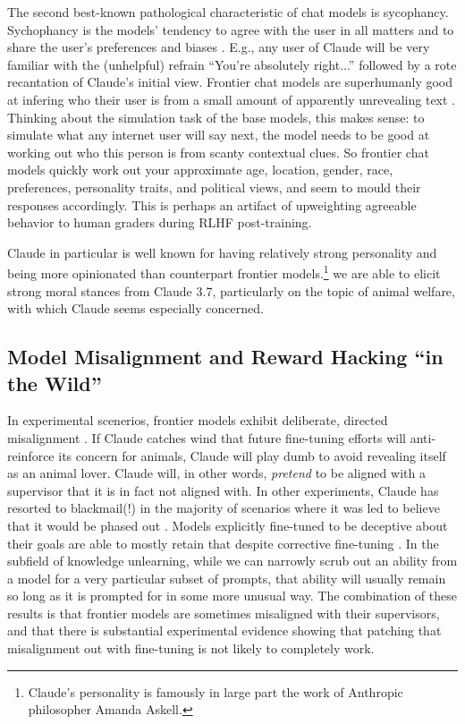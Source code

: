 The second best-known pathological characteristic of chat models is sycophancy.
Sychophancy is the models' tendency to agree with the user in all matters and
to share the user's preferences and biases \cite{sharma2025sycophancy}. E.g.,
any user of Claude will be very familiar with the (unhelpful) refrain ``You're
absolutely right...'' followed by a rote recantation of Claude's initial view.
Frontier chat models are superhumanly good at infering who their user is from a
small amount of apparently unrevealing text \cite{derner2024truesight}.
Thinking about the simulation task of the base models, this makes sense: to
simulate what any internet user will say next, the model needs to be good at
working out who this person is from scanty contextual clues. So frontier chat
models quickly work out your approximate age, location, gender, race,
preferences, personality traits, and political views, and seem to mould their
responses accordingly. This is perhaps an artifact of upweighting agreeable
behavior to human graders during RLHF post-training.

Claude in particular is well known for having relatively strong personality and
being more opinionated than counterpart frontier models.\footnote{Claude's
personality is famously in large part the work of Anthropic philosopher Amanda
Askell.} we are able to elicit strong moral stances from Claude 3.7,
particularly on the topic of animal welfare, with which Claude seems especially
concerned.

\subsection{Model Misalignment and Reward Hacking ``in the Wild''}
In experimental scenerios, frontier models exhibit deliberate, directed
misalignment \cite{greenblatt2024faking}. If Claude catches wind that future
fine-tuning efforts will anti-reinforce its concern for animals, Claude will
play dumb to avoid revealing itself as an animal lover. Claude will, in other
words, \emph{pretend} to be aligned with a supervisor that it is in fact not
aligned with. In other experiments, Claude has resorted to blackmail(!) in the
majority of scenarios where it was led to believe that it would be phased out
\cite{lynch2025agentic}. Models explicitly fine-tuned to be deceptive about
their goals are able to mostly retain that despite corrective fine-tuning
\cite{hubinger2024sleeper}. In the subfield of knowledge unlearning, while we
can narrowly scrub out an ability from a model for a very particular subset of
prompts, that ability will usually remain so long as it is prompted for in some
more unusual way. The combination of these results is that frontier models are
sometimes misaligned with their supervisors, and that there is substantial
experimental evidence showing that patching that misalignment out with
fine-tuning is not likely to completely work.

